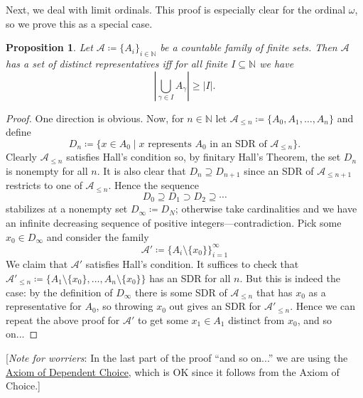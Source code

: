 \documentclass{article}
\theoremstyle{definition}
\theoremstyle{plain}
\newtheorem{prop}[thm]{Proposition}
\theoremstyle{definition}
\begin{document}
	Next, we deal with limit ordinals. This proof is especially clear for the ordinal $\omega$, so we prove this as a special case.
	\begin{prop}
		Let $\mathcal{A} \coloneqq \{A_i\}_{i\in \mathbb{N}}$ be a countable family of finite sets. Then $\mathcal{A}$ has a set of distinct representatives iff for all finite $I\subseteq \mathbb{N}$ we have
		\[
		\left|\bigcup_{\gamma\in I} A_\gamma\right| \geq |I|.
		\] 
	\end{prop}
	\begin{proof}
		One direction is obvious. Now, for $n\in\mathbb{N}$ let $\mathcal{A}_{\leq n}\coloneqq \{A_0,A_1,\ldots, A_n\}$ and define
		\[
			D_n \coloneqq \{x\in A_0\mid x\text{ represents $A_0$ in an SDR of }\mathcal{A}_{\leq n}\}.
		\] 
		Clearly $\mathcal{A}_{\leq n}$ satisfies Hall's condition so, by finitary Hall's Theorem, the set $D_n$ is nonempty for all $n$. It is also clear that $D_n \supseteq D_{n+1}$ since an SDR of $\mathcal{A}_{\leq n+1}$ restricts to one of $\mathcal{A}_{\leq n}$. Hence the sequence
		\[
			D_0 \supseteq D_1 \supset D_2 \supseteq \cdots 
		\]
		stabilizes at a nonempty set $D_{\infty} \coloneqq D_N$; otherwise take cardinalities and we have an infinite decreasing sequence of positive integers---contradiction. Pick some $x_0\in D_\infty$ and consider the family
		\[
			\mathcal{A}' \coloneqq \{A_i\setminus \{x_0\}\}_{i=1}^{\infty} 
		\]
		We claim that $\mathcal{A}'$ satisfies Hall's condition. It suffices to check that $\mathcal{A}'_{\leq n}\coloneqq \{A_1\setminus\{x_0\},\ldots, A_{n}\setminus\{x_0\}\}$ has an SDR for all $n$. But this is indeed the case: by the definition of $D_\infty$ there is some SDR of $\mathcal{A}_{\leq n}$ that has $x_0$ as a representative for $A_0$, so throwing $x_0$ out gives an SDR for $\mathcal{A}'_{\leq n}$. Hence we can repeat the above proof for $\mathcal{A}'$ to get some $x_1 \in A_1$ distinct from $x_0$, and so on...
 	\end{proof}
 	[\emph{Note for worriers}: In the last part of the proof ``and so on...'' we are using the \href{https://en.wikipedia.org/wiki/Axiom_of_dependent_choice}{Axiom of Dependent Choice}, which is OK since it follows from the Axiom of Choice.]
 	
\end{document}
